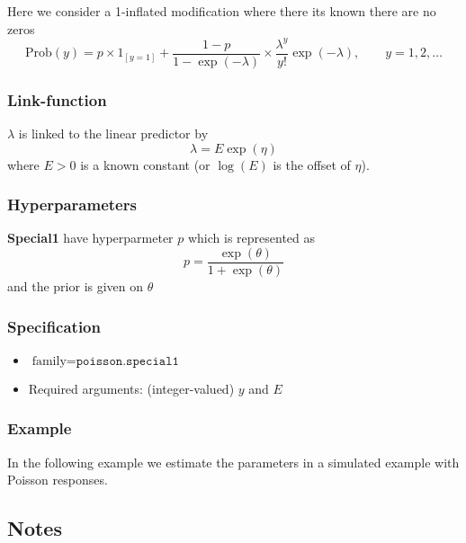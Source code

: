 \documentclass[a4paper,11pt]{article}
\begin{document}
\begin{description}
    \item
Here we consider a 1-inflated modification where there its known there
are no zeros
\begin{displaymath}
    \text{Prob}(y) = 
      p \times 1_{[y=1]} + \frac{1-p}{1-\exp(-\lambda)}
 \times
      \frac{\lambda^{y}}{y!}\exp(-\lambda), \qquad y=1, 2, \ldots
\end{displaymath}

\subsubsection*{Link-function}

$\lambda$ is linked to the linear predictor by
\begin{displaymath}
    \lambda = E \exp(\eta)
\end{displaymath}
where $E>0$ is a known constant (or $\log(E)$ is the offset of $\eta$).

\subsubsection*{Hyperparameters}

\textbf{Special1} have hyperparmeter $p$ which is represented as
\begin{displaymath}
    p = \frac{\exp(\theta)}{1+\exp(\theta)}
\end{displaymath}
and the prior is given on $\theta$




\subsubsection*{Specification}

\begin{itemize}
\item $\text{family}=\texttt{poisson.special1}$
\item Required arguments: (integer-valued) $y$ and $E$
\end{itemize}

\subsubsection*{Example}

In the following example we estimate the parameters in a simulated
example with Poisson responses.


\end{description}


\subsection*{Notes}
\end{document}
